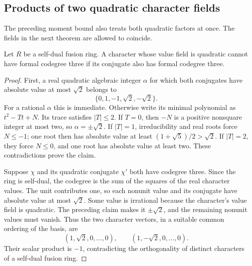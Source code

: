\subsection{Products of two quadratic character fields}
\label{sec:quadratic-product-bound}

The preceding moment bound also treats both quadratic factors at once.
The fields in the next theorem are allowed to coincide.

\begin{lemma}\label{lem:quadratic-codegree-three}
Let $R$ be a self-dual fusion ring. A character whose value field is
quadratic cannot have formal codegree three if its conjugate also has
formal codegree three.
\end{lemma}
\begin{proof}
First, a real quadratic algebraic integer $\alpha$ for which both
conjugates have absolute value at most $\sqrt2$ belongs to
\[
 \{0,1,-1,\sqrt2,-\sqrt2\}.
\]
For a rational $\alpha$ this is immediate. Otherwise write its minimal
polynomial as $t^2-Tt+N$. Its trace satisfies $|T|\leq2$.
If $T=0$, then $-N$ is a positive nonsquare integer at most two, so
$\alpha=\pm\sqrt2$. If $|T|=1$, irreducibility and real roots force
$N\leq-1$; one root then has absolute value at least
$(1+\sqrt5)/2>\sqrt2$. If $|T|=2$, they force $N\leq0$, and one
root has absolute value at least two. These contradictions prove the
claim.

Suppose $\chi$ and its quadratic conjugate $\chi'$ both have codegree
three. Since the ring is self-dual, the codegree is the sum of the
squares of the real character values. The unit contributes one, so
each nonunit value and its conjugate have absolute value at most
$\sqrt2$. Some value is irrational because the character's value
field is quadratic. The preceding claim makes it $\pm\sqrt2$,
and the remaining nonunit values must vanish. Thus the two character
vectors, in a suitable common ordering of the basis, are
\[
 (1,\sqrt2,0,\ldots,0),\qquad
 (1,-\sqrt2,0,\ldots,0).
\]
Their scalar product is $-1$, contradicting the orthogonality of
distinct characters of a self-dual fusion ring.
\end{proof}

